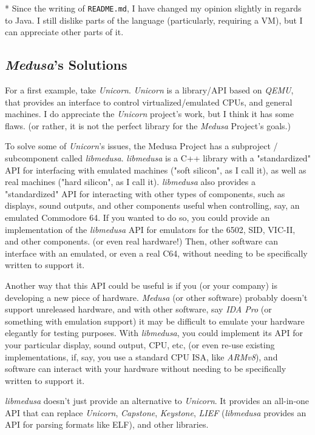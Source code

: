 \documentclass{article}
\begin{document}
	* Since the writing of \texttt{README.md}, I have changed my opinion slightly
	in regards to Java. I still dislike parts of the language (particularly,
	requiring a VM), but I can appreciate other parts of it.

	\subsection{\textit{Medusa}'s Solutions}
	For a first example, take \textit{Unicorn}. \textit{Unicorn} is a
	library/API based on \textit{QEMU}, that provides an interface to control
	virtualized/emulated CPUs, and general machines. I do appreciate the
	\textit{Unicorn} project's work, but I think it has some flaws. (or rather,
	it is not the perfect library for the \textit{Medusa} Project's goals.)

	To solve some of \textit{Unicorn}'s issues, the Medusa Project has a
	subproject / subcomponent called \textit{libmedusa}. \textit{libmedusa} is
	a C++ library with a "standardized" API for interfacing with emulated
	machines ("soft silicon", as I call it), as well as real machines ("hard
	silicon", as I call it). \textit{libmedusa} also provides a "standardized"
	API for interacting with other types of components, such as displays, sound
	outputs, and other components useful when controlling, say, an emulated
	Commodore 64. If you wanted to do so, you could provide an implementation of
	the \textit{libmedusa} API for emulators for the 6502, SID, VIC-II, and
	other components. (or even real hardware!) Then, other software can
	interface with an emulated, or even a real C64, without needing to be
	specifically written to support it.

	Another way that this API could be useful is if you (or your company) is
	developing a new piece of hardware. \textit{Medusa} (or other software)
	probably doesn't support unreleased hardware, and with other software, say
	\textit{IDA Pro} (or something with emulation support) it may be difficult
	to emulate your hardware elegantly for testing purposes. With
	\textit{libmedusa}, you could implement its API for your particular display,
	sound output, CPU, etc, (or even re-use existing implementations, if, say,
	you use a standard CPU ISA, like \textit{ARMv8}), and software can interact
	with your hardware without needing to be specifically written to support it.

	\textit{libmedusa} doesn't just provide an alternative to \textit{Unicorn}.
	It provides an all-in-one API that can replace \textit{Unicorn},
	\textit{Capstone}, \textit{Keystone}, \textit{LIEF} (\textit{libmedusa}
	provides an API for parsing formats like ELF), and other libraries.
\end{document}
